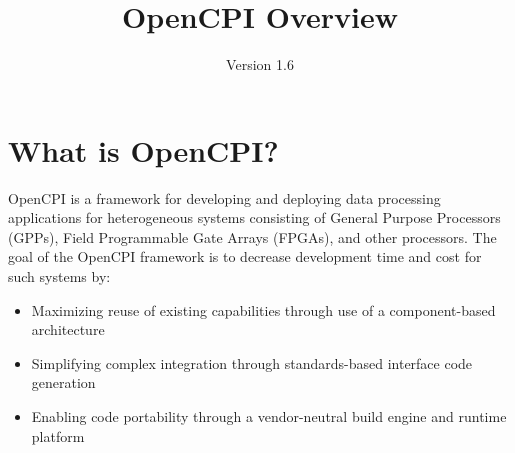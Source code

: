 \iffalse
This file is protected by Copyright. Please refer to the COPYRIGHT file
distributed with this source distribution.

This file is part of OpenCPI <http://www.opencpi.org>

OpenCPI is free software: you can redistribute it and/or modify it under the
terms of the GNU Lesser General Public License as published by the Free Software
Foundation, either version 3 of the License, or (at your option) any later
version.

OpenCPI is distributed in the hope that it will be useful, but WITHOUT ANY
WARRANTY; without even the implied warranty of MERCHANTABILITY or FITNESS FOR A
PARTICULAR PURPOSE. See the GNU Lesser General Public License for more details.

You should have received a copy of the GNU Lesser General Public License along
with this program. If not, see <http://www.gnu.org/licenses/>.
\fi
\def\docTitle{OpenCPI Overview}
\def\docVersion{1.6}
\def\snippetpath{snippets}


\setlength{\parindent}{0pt} %
\newcommand{\forceindent}{\leavevmode{\parindent=1em\indent}}
\date{Version \docVersion} %
\title{\docTitle}
\lhead{\small {\docTitle} }
\def\bstart{~\\
\begin{minipage}{\linewidth}}
\def\bend{\end{minipage}
~\\
}

\section*{What is OpenCPI?}
\label{sec:what_is_opencpi}
OpenCPI is a framework for developing and deploying data processing applications for heterogeneous systems consisting of General Purpose Processors (GPPs), Field Programmable Gate Arrays (FPGAs), and other processors. The goal of the OpenCPI framework is to decrease development time and cost for such systems by:
\begin{itemize}
\item Maximizing reuse of existing capabilities through use of a component-based architecture
\item Simplifying complex integration through standards-based interface code generation
\item Enabling code portability through a vendor-neutral build engine and runtime platform
\end{itemize}

